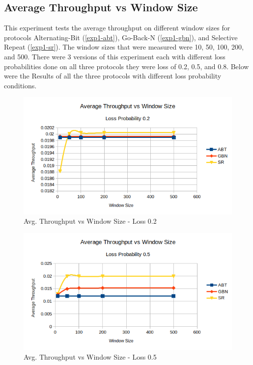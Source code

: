 \documentclass[10pt, a4paper]{article}
\begin{document}
  \subsection{Average Throughput vs Window Size}
    This experiment tests the average throughput on different window sizes for protocols Alternating-Bit (\ref{exp1-abt}), Go-Back-N (\ref{exp1-gbn}), and Selective Repeat (\ref{exp1-sr}). The window sizes that were measured were 10, 50, 100, 200, and 500. There were 3 versions of this experiment each with different loss probabilities done on all three protocols they were loss of 0.2, 0.5, and 0.8. Below were the Results of all the three protocols with different loss probability conditions. 
    
    \begin{figure}[H]
        \includegraphics[width=\textwidth]{exp2-l02.png}
        \centering
        \caption{Avg. Throughput vs Window Size - Loss 0.2 }
        \label{fig:exp2-l0.2}
    \end{figure}
      
    \begin{figure}[H]
        \includegraphics[width=\textwidth]{exp2-l05.png}
        \centering
        \caption{Avg. Throughput vs Window Size - Loss 0.5  }
        \label{fig:exp2-l0.5}
    \end{figure}
        
\end{document}
